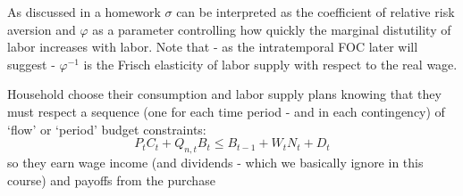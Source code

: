 \documentclass[authoryear,11pt]{elsarticle}
\begin{document}
As discussed in a homework $\sigma$ can be interpreted as the coefficient of relative risk aversion and $\varphi$ as a parameter controlling how quickly the marginal distutility of labor increases with labor. Note that - as the intratemporal FOC later will suggest - $\varphi^{-1}$ is the Frisch elasticity of labor supply with respect to the real wage.

Household choose their consumption and labor supply plans knowing that they must respect a sequence (one for each time period - and in each contingency) of `flow' or `period' budget constraints:
\begin{equation*}
P_{t} C_{t} + Q_{n,t} B_{t} \leq B_{t-1} + W_{t} N_{t} + D_{t}
\end{equation*}
so they earn wage income (and dividends - which we basically ignore in this course) and payoffs from the purchase
\end{document}
